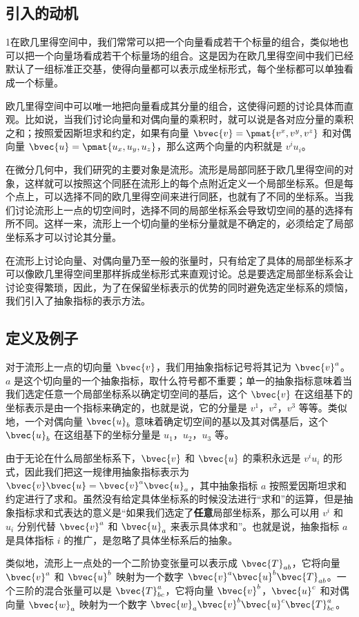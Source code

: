 

\begin{issues}
\issueMissDepend
\end{issues}

\subsection{引入的动机}
1在欧几里得空间中，我们常常可以把一个向量看成若干个标量的组合，类似地也可以把一个向量场看成若干个标量场的组合。这是因为在欧几里得空间中我们已经默认了一组标准正交基，使得向量都可以表示成坐标形式，每个坐标都可以单独看成一个标量。

欧几里得空间中可以唯一地把向量看成其分量的组合，这使得问题的讨论具体而直观。比如说，当我们讨论向量和对偶向量的乘积时，就可以说是各对应分量的乘积之和；按照爱因斯坦求和约定，如果有向量 $\bvec{v}=\pmat{v^x, v^y, v^z}$ 和对偶向量 $\bvec{u}=\pmat{u_x, u_y, u_z}$，那么这两个向量的内积就是 $v^iu_i$。

在微分几何中，我们研究的主要对象是流形。流形是局部同胚于欧几里得空间的对象，这样就可以按照这个同胚在流形上的每个点附近定义一个局部坐标系。但是每个点上，可以选择不同的欧几里得空间来进行同胚，也就有了不同的坐标系。当我们讨论流形上一点的切空间时，选择不同的局部坐标系会导致切空间的基的选择有所不同。这样一来，流形上一个切向量的坐标分量就是不确定的，必须给定了局部坐标系才可以讨论其分量。

在流形上讨论向量、对偶向量乃至一般的张量时，只有给定了具体的局部坐标系才可以像欧几里得空间里那样拆成坐标形式来直观讨论。总是要选定局部坐标系会让讨论变得繁琐，因此，为了在保留坐标表示的优势的同时避免选定坐标系的烦恼，我们引入了抽象指标的表示方法。

\subsection{定义及例子}

对于流形上一点的切向量 $\bvec{v}$，我们用抽象指标记号将其记为 $\bvec{v}^a$。$a$ 是这个切向量的一个抽象指标，取什么符号都不重要；单一的抽象指标意味着当我们选定任意一个局部坐标系以确定切空间的基后，这个 $\bvec{v}$ 在这组基下的坐标表示是由一个指标来确定的，也就是说，它的分量是 $v^1$，$v^2$，$v^3$ 等等。类似地，一个对偶向量 $\bvec{u}_b$ 意味着确定切空间的基以及其对偶基后，这个 $\bvec{u}_b$ 在这组基下的坐标分量是 $u_1$，$u_2$，$u_3$ 等。

由于无论在什么局部坐标系下，$\bvec{v}$ 和 $\bvec{u}$ 的乘积永远是 $v^iu_i$ 的形式，因此我们把这一规律用抽象指标表示为 $\bvec{v}\bvec{u}=\bvec{v}^a\bvec{u}_a$，其中抽象指标 $a$ 按照爱因斯坦求和约定进行了求和。虽然没有给定具体坐标系的时候没法进行“求和”的运算，但是抽象指标求和式表达的意义是“如果我们选定了\textbf{任意}局部坐标系，那么可以用 $v^i$ 和 $u_i$ 分别代替 $\bvec{v}^a$ 和 $\bvec{u}_a$ 来表示具体求和”。也就是说，抽象指标 $a$ 是具体指标 $i$ 的推广，是忽略了具体坐标系后的抽象。

类似地，流形上一点处的一个二阶协变张量可以表示成 $\bvec{T}_{ab}$，它将向量 $\bvec{v}^a$ 和 $\bvec{u}^b$ 映射为一个数字 $\bvec{v}^a\bvec{u}^b\bvec{T}_{ab}$。一个三阶的混合张量可以是 $\bvec{T}^a_{bc}$，它将向量 $\bvec{v}^b$，$\bvec{u}^c$ 和对偶向量 $\bvec{w}_a$ 映射为一个数字 $\bvec{w}_a\bvec{v}^b\bvec{u}^c\bvec{T}_{bc}^a$。





